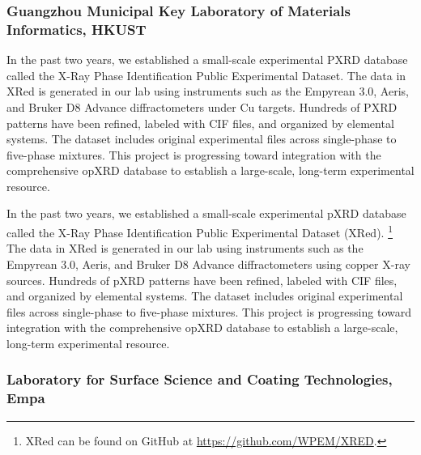 \subsubsection*{Guangzhou Municipal Key Laboratory of Materials Informatics, HKUST}

In the past two years, we established a small-scale experimental PXRD database called the X-Ray Phase Identification Public Experimental Dataset. The data in XRed is generated in our lab using instruments such as the Empyrean 3.0, Aeris, and Bruker D8 Advance diffractometers under Cu targets. Hundreds of PXRD patterns have been refined, labeled with CIF files, and organized by elemental systems. The dataset includes original experimental files across single-phase to five-phase mixtures. This project is progressing toward integration with the comprehensive opXRD database to establish a large-scale, long-term experimental resource. 

In the past two years, we established a small-scale experimental pXRD database called the X-Ray Phase Identification Public Experimental Dataset (XRed). \footnote{XRed can be found on GitHub at \url{https://github.com/WPEM/XRED}.} The data in XRed is generated in our lab using instruments such as the Empyrean 3.0, Aeris, and Bruker D8 Advance diffractometers using copper X-ray sources. Hundreds of pXRD patterns have been refined, labeled with CIF files, and organized by elemental systems. The dataset includes original experimental files across single-phase to five-phase mixtures. This project is progressing toward integration with the comprehensive opXRD database to establish a large-scale, long-term experimental resource. 

\subsubsection*{Laboratory for Surface Science and Coating Technologies, Empa}

